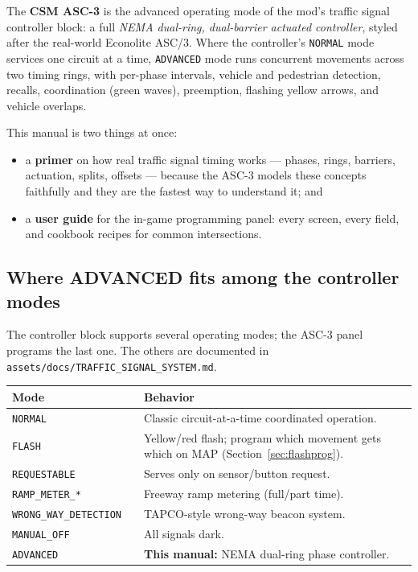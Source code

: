 \documentclass[11pt]{article}
\newcommand{\screen}[1]{\textsc{#1}}
\begin{document}
The \textbf{CSM ASC-3} is the advanced operating mode of the mod's traffic signal
controller block: a full \emph{NEMA dual-ring, dual-barrier actuated controller},
styled after the real-world Econolite ASC/3. Where the controller's \texttt{NORMAL}
mode services one circuit at a time, \texttt{ADVANCED} mode runs concurrent
movements across two timing rings, with per-phase intervals, vehicle and pedestrian
detection, recalls, coordination (green waves), preemption, flashing yellow arrows,
and vehicle overlaps.

This manual is two things at once:

\begin{itemize}[nosep]
  \item a \textbf{primer} on how real traffic signal timing works — phases, rings,
        barriers, actuation, splits, offsets — because the ASC-3 models these
        concepts faithfully and they are the fastest way to understand it; and
  \item a \textbf{user guide} for the in-game programming panel: every screen,
        every field, and cookbook recipes for common intersections.
\end{itemize}

\subsection{Where ADVANCED fits among the controller modes}

The controller block supports several operating modes; the ASC-3 panel programs the
last one. The others are documented in \texttt{assets/docs/TRAFFIC\_SIGNAL\_SYSTEM.md}.

\begin{center}\small
\begin{tabular}{@{}llp{8.6cm}@{}}
\toprule
\textbf{Mode} & & \textbf{Behavior} \\
\midrule
\texttt{NORMAL}       & & Classic circuit-at-a-time coordinated operation. \\
\texttt{FLASH}        & & Yellow/red flash; program which movement gets which
                          on \screen{MAP} (Section~\ref{sec:flashprog}). \\
\texttt{REQUESTABLE}  & & Serves only on sensor/button request. \\
\texttt{RAMP\_METER\_*} & & Freeway ramp metering (full/part time). \\
\texttt{WRONG\_WAY\_DETECTION} & & TAPCO-style wrong-way beacon system. \\
\texttt{MANUAL\_OFF}  & & All signals dark. \\
\texttt{ADVANCED}     & & \textbf{This manual:} NEMA dual-ring phase controller. \\
\bottomrule
\end{tabular}
\end{center}
\end{document}
